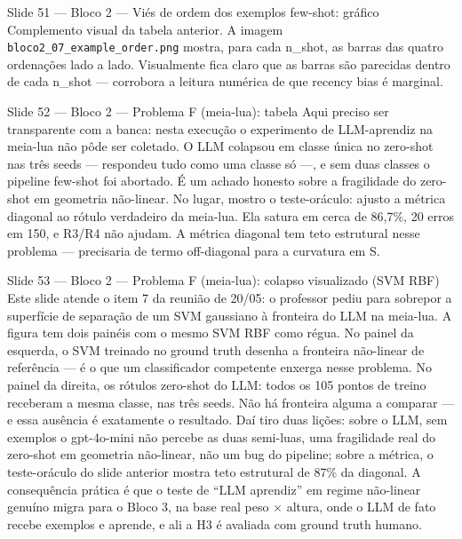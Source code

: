 \documentclass[aspectratio=169,10pt]{beamer}
\begin{document}
\begin{frame}{Slide 51 --- Bloco 2 --- Vi\'es de ordem dos exemplos few-shot: gr\'afico}
\footnotesize
Complemento visual da tabela anterior. A imagem \texttt{bloco2\_07\_example\_order.png} mostra, para cada n\_shot, as barras das quatro ordena\c{c}\~oes lado a lado. Visualmente fica claro que as barras s\~ao parecidas dentro de cada n\_shot --- corrobora a leitura num\'erica de que recency bias \'e marginal.
\end{frame}

\begin{frame}{Slide 52 --- Bloco 2 --- Problema F (meia-lua): tabela}
\footnotesize
Aqui preciso ser transparente com a banca: nesta execu\c{c}\~ao o experimento de LLM-aprendiz na meia-lua n\~ao p\^ode ser coletado. O LLM colapsou em classe \'unica no zero-shot nas tr\^es seeds --- respondeu tudo como uma classe s\'o ---, e sem duas classes o pipeline few-shot foi abortado. \'E um achado honesto sobre a fragilidade do zero-shot em geometria n\~ao-linear. No lugar, mostro o teste-or\'aculo: ajusto a m\'etrica diagonal ao r\'otulo verdadeiro da meia-lua. Ela satura em cerca de 86,7\%, 20 erros em 150, e R3/R4 n\~ao ajudam. A m\'etrica diagonal tem teto estrutural nesse problema --- precisaria de termo off-diagonal para a curvatura em S.
\end{frame}

\begin{frame}{Slide 53 --- Bloco 2 --- Problema F (meia-lua): colapso visualizado (SVM RBF)}
\footnotesize
Este slide atende o item 7 da reuni\~ao de 20/05: o professor pediu para sobrepor a superf\'icie de separa\c{c}\~ao de um SVM gaussiano \`a fronteira do LLM na meia-lua. A figura tem dois pain\'eis com o mesmo SVM RBF como r\'egua. No painel da esquerda, o SVM treinado no ground truth desenha a fronteira n\~ao-linear de refer\^encia --- \'e o que um classificador competente enxerga nesse problema. No painel da direita, os r\'otulos zero-shot do LLM: todos os 105 pontos de treino receberam a mesma classe, nas tr\^es seeds. N\~ao h\'a fronteira alguma a comparar --- e essa aus\^encia \'e exatamente o resultado. Da\'i tiro duas li\c{c}\~oes: sobre o LLM, sem exemplos o gpt-4o-mini n\~ao percebe as duas semi-luas, uma fragilidade real do zero-shot em geometria n\~ao-linear, n\~ao um bug do pipeline; sobre a m\'etrica, o teste-or\'aculo do slide anterior mostra teto estrutural de 87\% da diagonal. A consequ\^encia pr\'atica \'e que o teste de ``LLM aprendiz'' em regime n\~ao-linear genu\'ino migra para o Bloco 3, na base real peso $\times$ altura, onde o LLM de fato recebe exemplos e aprende, e ali a H3 \'e avaliada com ground truth humano.
\end{frame}
\end{document}
